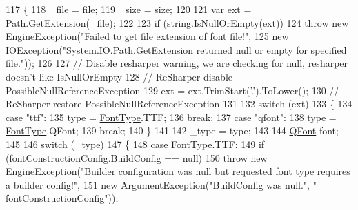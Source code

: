\begin{DoxyCode}
117         \{
118             \_file = file;
119             \_size = size;
120 
121             var ext = Path.GetExtension(\_file);
122 
123             \textcolor{keywordflow}{if} (\textcolor{keywordtype}{string}.IsNullOrEmpty(ext))
124                 \textcolor{keywordflow}{throw} \textcolor{keyword}{new} EngineException(\textcolor{stringliteral}{"Failed to get file extension of font file!"},
125                                           \textcolor{keyword}{new} IOException(\textcolor{stringliteral}{"System.IO.Path.GetExtension returned null or
       empty for specified file."}));
126 
127             \textcolor{comment}{// Disable resharper warning, we are checking for null, resharper doesn't like IsNullOrEmpty}
128             \textcolor{comment}{// ReSharper disable PossibleNullReferenceException}
129             ext = ext.TrimStart(\textcolor{charliteral}{'.'}).ToLower();
130             \textcolor{comment}{// ReSharper restore PossibleNullReferenceException}
131 
132             \textcolor{keywordflow}{switch} (ext)
133             \{
134                 \textcolor{keywordflow}{case} \textcolor{stringliteral}{"ttf"}:
135                     type = \hyperlink{namespace_tri_devs_1_1_tri_engine2_d_1_1_text_aa624efa98f1dcfec7cddff37f08bbe75}{FontType}.TTF;
136                     \textcolor{keywordflow}{break};
137                 \textcolor{keywordflow}{case} \textcolor{stringliteral}{"qfont"}:
138                     type = \hyperlink{namespace_tri_devs_1_1_tri_engine2_d_1_1_text_aa624efa98f1dcfec7cddff37f08bbe75}{FontType}.QFont;
139                     \textcolor{keywordflow}{break};
140             \}
141 
142             \_type = type;
143 
144             \hyperlink{class_tri_devs_1_1_tri_engine2_d_1_1_text_1_1_font_a019de011e935ea9017eb805ff778581a}{QFont} font;
145 
146             \textcolor{keywordflow}{switch} (\_type)
147             \{
148                 \textcolor{keywordflow}{case} \hyperlink{namespace_tri_devs_1_1_tri_engine2_d_1_1_text_aa624efa98f1dcfec7cddff37f08bbe75}{FontType}.TTF:
149                     \textcolor{keywordflow}{if} (fontConstructionConfig.BuildConfig == null)
150                         \textcolor{keywordflow}{throw} \textcolor{keyword}{new} EngineException(\textcolor{stringliteral}{"Builder configuration was null but requested font type
       requires a builder config!"},
151                                                   \textcolor{keyword}{new} ArgumentException(\textcolor{stringliteral}{"BuildConfig was null."}, \textcolor{stringliteral}{"
      fontConstructionConfig"}));

\end{DoxyCode}
